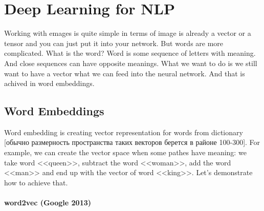\chapter{Deep Learning for NLP}

{\sf Working with emages is quite simple in terms of image is already a vector or a tensor and you can just put it into your network. But words are more complicated. What is the word? Word is some sequence of letters with meaning. And close sequences can have opposite meanings. What we want to do is we still want to have a vector what we can feed into the neural network. And that is achived in word embeddings.}

\section{Word Embeddings}

Word embedding is creating vector representation for words from dictionary [обычно размерность пространства таких векторов берется в районе 100-300]. For example, we can create the vector space when some pathes have meaning: we take word <<queen>>, subtract the word <<woman>>, add the word <<man>> and end up with the vector of word <<king>>. Let's demonstrate how to achieve that.

\subsubsection*{word2vec (Google 2013)}

